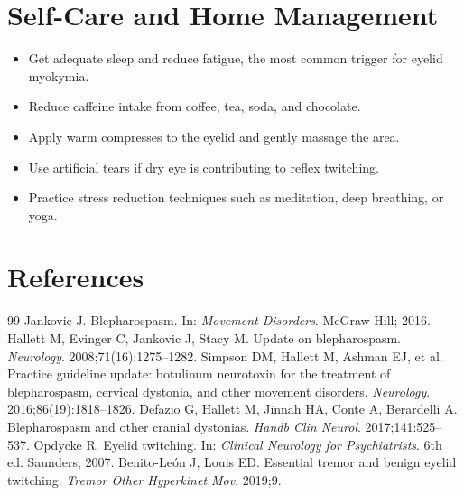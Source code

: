 \section*{Self-Care and Home Management}
\begin{itemize}
  \item Get adequate sleep and reduce fatigue, the most common trigger for eyelid myokymia.
  \item Reduce caffeine intake from coffee, tea, soda, and chocolate.
  \item Apply warm compresses to the eyelid and gently massage the area.
  \item Use artificial tears if dry eye is contributing to reflex twitching.
  \item Practice stress reduction techniques such as meditation, deep breathing, or yoga.
\end{itemize}

\section*{References}
\begin{thebibliography}{99}
Jankovic J. Blepharospasm. In: \textit{Movement Disorders}. McGraw-Hill; 2016.
Hallett M, Evinger C, Jankovic J, Stacy M. Update on blepharospasm. \textit{Neurology}. 2008;71(16):1275--1282.
Simpson DM, Hallett M, Ashman EJ, et al. Practice guideline update: botulinum neurotoxin for the treatment of blepharospasm, cervical dystonia, and other movement disorders. \textit{Neurology}. 2016;86(19):1818--1826.
Defazio G, Hallett M, Jinnah HA, Conte A, Berardelli A. Blepharospasm and other cranial dystonias. \textit{Handb Clin Neurol}. 2017;141:525--537.
Opdycke R. Eyelid twitching. In: \textit{Clinical Neurology for Psychiatrists}. 6th ed. Saunders; 2007.
Benito-Le\'{o}n J, Louis ED. Essential tremor and benign eyelid twitching. \textit{Tremor Other Hyperkinet Mov}. 2019;9.
\end{thebibliography}
